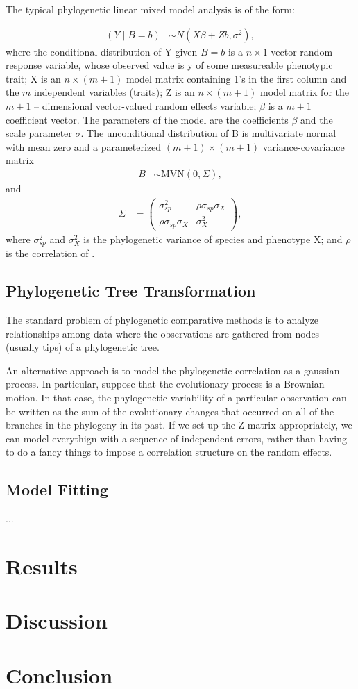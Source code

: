 \documentclass[12pt]{article}
\begin{document}
The typical phylogenetic linear mixed model analysis is of the form:

\begin{align}
(Y \mid B=b) & \sim N(X\beta + Zb, \sigma^{2}),
\end{align}
where the conditional distribution of Y given $ B = b$ is a $n \times 1$ vector random response variable, whose observed value is y of some measureable phenotypic trait; 
X is an $n \times (m + 1)$ model matrix containing 1's in the first column and the $m$ independent variables (traits);
Z is an $n \times (m + 1)$ model matrix for the $m + 1$ -- dimensional vector-valued random effects variable; 
$\beta$ is a $ m + 1 $ coefficient vector.
The parameters of the model are the coefficients $\beta$ and the scale parameter $\sigma$.
The unconditional distribution of B is multivariate normal with mean zero and a parameterized $(m + 1) \times (m + 1)$ variance-covariance matrix
\begin{align}
B & \sim \mathrm{MVN}(0,\Sigma),
\end{align}
and
\begin{align}
\Sigma & = \begin{pmatrix} \sigma^2_{sp} & \rho \sigma_{sp} \sigma_{X} \\ \rho \sigma_{sp} \sigma_{X} & \sigma^2_{X} \end{pmatrix},
\end{align}
where $\sigma^{2}_{sp}$ and $\sigma^{2}_{X}$ is the phylogenetic variance of species and phenotype X; 
and $\rho$ is the correlation of .


\subsection{Phylogenetic Tree Transformation}
The standard problem of phylogenetic comparative methods is to analyze relationships among data where the observations are gathered from nodes (usually tips) of a phylogenetic tree. 

An alternative approach is to model the phylogenetic correlation as a gaussian process. 
In particular, suppose that the evolutionary process is a Brownian motion. 
In that case, the phylogenetic variability of a particular observation can be written as the sum of the evolutionary changes that occurred on all of the branches in the phylogeny in its past. 
If we set up the Z matrix appropriately, we can model everythign with a sequence of independent errors, rather than having to do a fancy things to impose a correlation structure on the random effects. 

\subsection{Model Fitting}

...


\section{Results}

\section{Discussion}

\section{Conclusion}
\end{document}
